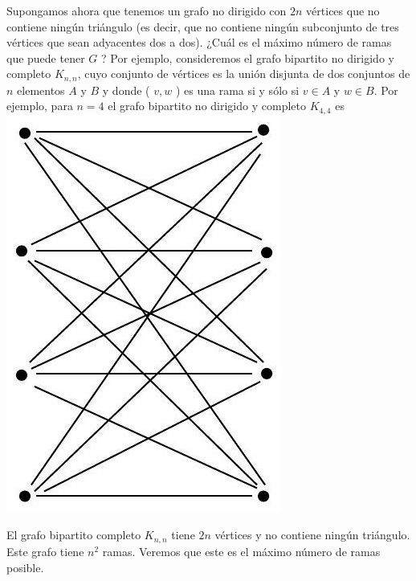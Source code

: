 \documentclass[10pt]{article}
\begin{document}
Supongamos ahora que tenemos un grafo no dirigido con $2 n$ vértices que no contiene ningún triángulo (es decir, que no contiene ningún subconjunto de tres vértices que sean adyacentes dos a dos). ¿Cuál es el máximo número de ramas que puede tener $G$ ? Por ejemplo, consideremos el grafo bipartito no dirigido y completo $K_{n, n}$, cuyo conjunto de vértices es la unión disjunta de dos conjuntos de $n$ elementos $A$ y $B$ y donde ( $v, w$ ) es una rama si y sólo si $v \in A$ y $w \in B$. Por ejemplo, para $n=4$ el grafo bipartito no dirigido y completo $K_{4,4}$ es\\
\includegraphics[max width=\textwidth, center]{2025_09_05_b69e29efaf9a6d2aa81ag-07(2)}

El grafo bipartito completo $K_{n, n}$ tiene $2 n$ vértices y no contiene ningún triángulo. Este grafo tiene $n^{2}$ ramas. Veremos que este es el máximo número de ramas posible.
\end{document}
